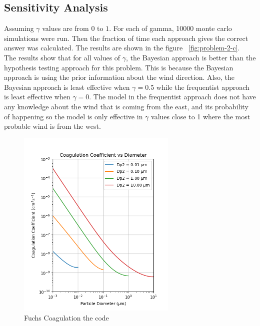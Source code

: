 \documentclass[12pt]{article}
\begin{document}
\newpage
\subsection{Sensitivity Analysis}\label{subsec:problem-2-c}

Assuming $\gamma$ values are from $0$ to $1$.
For each of gamma, 10000 monte carlo simulations were run.
Then the fraction of time each approach gives the correct answer was calculated.
The results are shown in the figure ~\ref{fig:problem-2-c}.\\
The results show that for all values of $\gamma$, the Bayesian approach is better than the hypothesis testing approach for this problem.
This is because the Bayesian approach is using the prior information about the wind direction.
Also, the Bayesian approach is least effective when $\gamma = 0.5$ while the frequentist approach is least effective when $\gamma = 0$.
The model in the frequentist approach does not have any knowledge about the wind that is coming from the east, and its probability of happening so the model is only effective in $\gamma$ values close to 1 where the most probable wind is from the west.

\newpage

\begin{figure}\label{fig:problem-2-a-1}
\begin{center}
\includegraphics[width=3in]{hw2_pr2_1_coagulation_coefficient_vs_diameter}
\caption{Fuchs Coagulation the code}
\end{center}
\end{figure}
\end{document}
